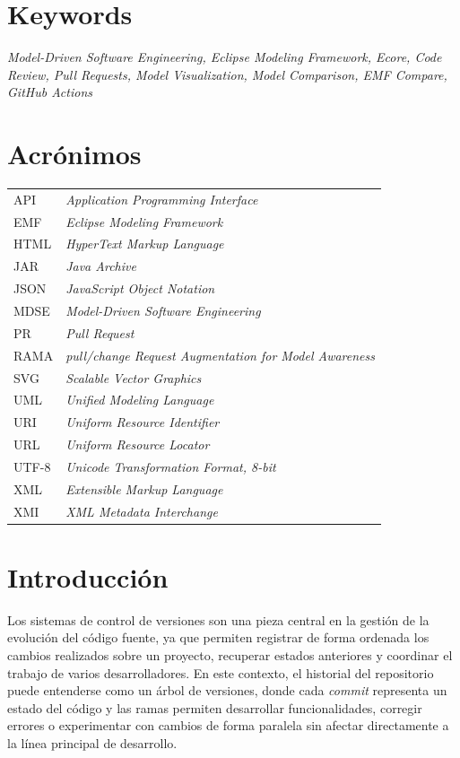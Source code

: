 \documentclass[11pt]{article}
\begin{document}
{}
\section*{Keywords}

\textit{Model-Driven Software Engineering, Eclipse Modeling Framework, Ecore, Code Review, Pull Requests, Model Visualization, Model Comparison, EMF Compare, GitHub Actions}

\newpage

{}
\section*{Acrónimos}

\begin{tabular}{ll}
API & \textit{Application Programming Interface} \\
EMF & \textit{Eclipse Modeling Framework} \\
HTML & \textit{HyperText Markup Language} \\
JAR & \textit{Java Archive} \\
JSON & \textit{JavaScript Object Notation} \\
MDSE & \textit{Model-Driven Software Engineering} \\
PR & \textit{Pull Request} \\
RAMA & \textit{pull/change Request Augmentation for Model Awareness} \\
SVG & \textit{Scalable Vector Graphics} \\
UML & \textit{Unified Modeling Language} \\
URI & \textit{Uniform Resource Identifier} \\
URL & \textit{Uniform Resource Locator} \\
UTF-8 & \textit{Unicode Transformation Format, 8-bit} \\
XML & \textit{Extensible Markup Language} \\
XMI & \textit{XML Metadata Interchange} \\
\end{tabular}

\newpage

\section{Introducción}

Los sistemas de control de versiones son una pieza central en la gestión de la evolución del código fuente, ya que permiten registrar de forma ordenada los cambios realizados sobre un proyecto, recuperar estados anteriores y coordinar el trabajo de varios desarrolladores. En este contexto, el historial del repositorio puede entenderse como un árbol de versiones, donde cada \textit{commit} representa un estado del código y las ramas permiten desarrollar funcionalidades, corregir errores o experimentar con cambios de forma paralela sin afectar directamente a la línea principal de desarrollo.
\end{document}
